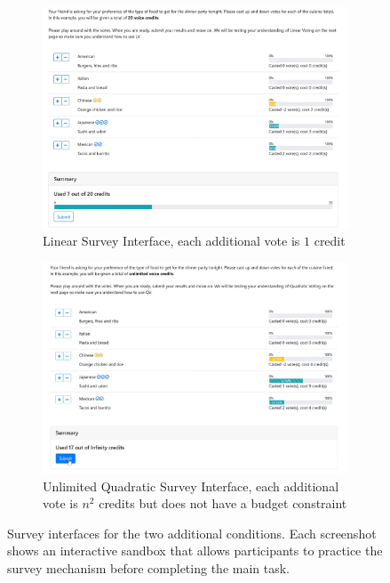 \begin{figure}
    \centering
    \begin{subfigure}{0.75\textwidth}
        \centering
        \includegraphics[width=\textwidth]{content/image/linear.png}
        \caption{Linear Survey Interface, each additional vote is $1$ credit}
        \label{fig:qs_interface}
    \end{subfigure}
    
    \vspace*{1cm}

    \begin{subfigure}{0.75\textwidth}
        \centering
        \includegraphics[width=\textwidth]{content/image/uqs.png}
        \caption{Unlimited Quadratic Survey Interface, each additional vote is $n^2$ credits but does not have a budget constraint}
        \label{fig:css_interface}
    \end{subfigure}
    
    \caption{Survey interfaces for the two additional conditions. Each screenshot shows an interactive sandbox that allows  participants to practice the survey mechanism before completing the main task.}
    \label{fig:extended_interface}
\end{figure}

